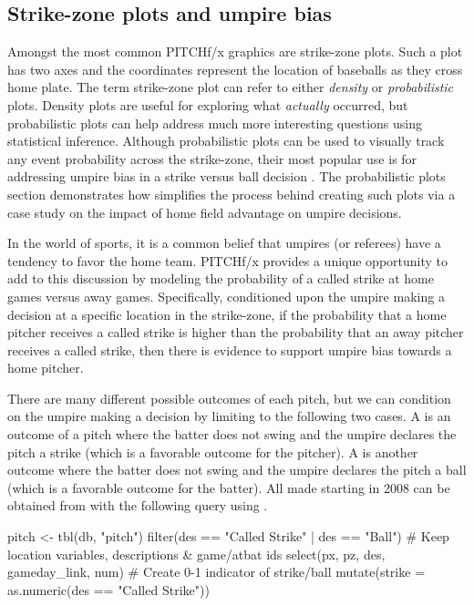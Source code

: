 \begin{article}
\subsection{Strike-zone plots and umpire bias}
Amongst the most common PITCHf/x graphics are strike-zone plots. Such
a plot has two axes and the coordinates represent the location of
baseballs as they cross home plate. The term strike-zone plot can
refer to either \emph{density} or \emph{probabilistic} plots. Density
plots are useful for exploring what \emph{actually} occurred, but
probabilistic plots can help address much more interesting questions
using statistical inference. Although probabilistic plots can be used
to visually track any event probability across the strike-zone, their
most popular use is for addressing umpire bias in a strike versus
ball decision \citet{bias}. The probabilistic plots section demonstrates
how  simplifies the process behind creating such plots
via a case study on the impact of home field advantage on umpire decisions.

In the world of sports, it is a common belief that umpires (or referees)
have a tendency to favor the home team. PITCHf/x provides a unique
opportunity to add to this discussion by modeling the probability
of a called strike at home games versus away games. Specifically,
conditioned upon the umpire making a decision at a specific location
in the strike-zone, if the probability that a home pitcher receives
a called strike is higher than the probability that an away pitcher
receives a called strike, then there is evidence to support umpire
bias towards a home pitcher.

There are many different possible outcomes of each pitch, but we can
condition on the umpire making a decision by limiting to the following
two cases. A  is an outcome of a pitch where the
batter does not swing and the umpire declares the pitch a strike (which
is a favorable outcome for the pitcher). A  is another
outcome where the batter does not swing and the umpire declares the
pitch a ball (which is a favorable outcome for the batter). All 
made starting in 2008 can be obtained from  with the following
query using .
%
\begin{Schunk}
\begin{Sinput}
pitch <- tbl(db, "pitch") %
  filter(des == "Called Strike" | des == "Ball") %
# Keep location variables, descriptions & game/atbat ids  
  select(px, pz, des, gameday_link, num) %
# Create 0-1 indicator of strike/ball   
  mutate(strike = as.numeric(des == "Called Strike")) 
  

\end{Sinput}
\end{Schunk}
\end{article}
